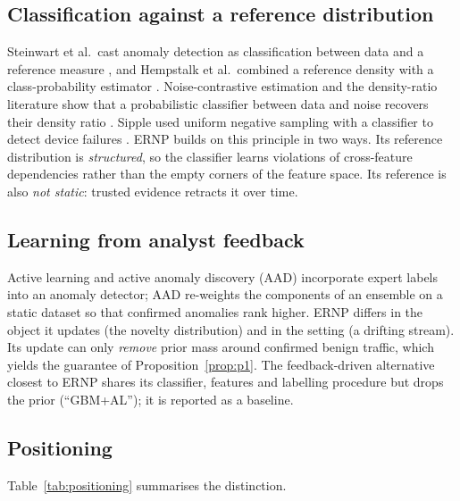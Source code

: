 \documentclass[a4paper,fleqn]{cas-dc}
\newcommand{\ERNP}{ERNP\xspace}
\begin{document}
\subsection{Classification against a reference distribution}
Steinwart et al.\ cast anomaly detection as classification between data and a reference measure \cite{steinwart2005classification}, and Hempstalk et al.\ combined a reference density with a class-probability estimator \cite{hempstalk2008oneclass}. Noise-contrastive estimation and the density-ratio literature show that a probabilistic classifier between data and noise recovers their density ratio \cite{gutmann2010nce,sugiyama2012density}. Sipple used uniform negative sampling with a classifier to detect device failures \cite{sipple2020negative}. \ERNP builds on this principle in two ways. Its reference distribution is \emph{structured}, so the classifier learns violations of cross-feature dependencies rather than the empty corners of the feature space. Its reference is also \emph{not static}: trusted evidence retracts it over time.

\subsection{Learning from analyst feedback}
Active learning \cite{settles2009active} and active anomaly discovery (AAD) \cite{das2016aad,das2020expert} incorporate expert labels into an anomaly detector; AAD re-weights the components of an ensemble on a static dataset so that confirmed anomalies rank higher. \ERNP differs in the object it updates (the novelty distribution) and in the setting (a drifting stream). Its update can only \emph{remove} prior mass around confirmed benign traffic, which yields the guarantee of Proposition~\ref{prop:p1}. The feedback-driven alternative closest to \ERNP shares its classifier, features and labelling procedure but drops the prior (``GBM+AL''); it is reported as a baseline.

\subsection{Positioning}
Table~\ref{tab:positioning} summarises the distinction.
\end{document}
